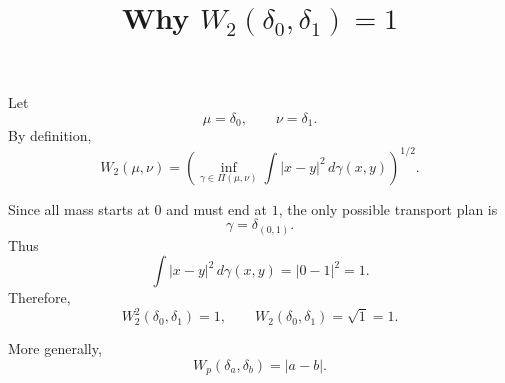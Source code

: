 \documentclass[11pt]{article}
\title{Why $W_2(\delta_0,\delta_1)=1$}
\author{}
\date{}
\begin{document}
\maketitle

Let
\[
\mu=\delta_0,
\qquad
\nu=\delta_1.
\]
By definition,
\[
W_2(\mu,\nu)
=
\left(
\inf_{\gamma\in\Pi(\mu,\nu)}
\int |x-y|^2\,d\gamma(x,y)
\right)^{1/2}.
\]

Since all mass starts at $0$ and must end at $1$, the only possible transport
plan is
\[
\gamma=\delta_{(0,1)}.
\]
Thus
\[
\int |x-y|^2\,d\gamma(x,y)
=
|0-1|^2
=
1.
\]
Therefore,
\[
W_2^2(\delta_0,\delta_1)=1,
\qquad
W_2(\delta_0,\delta_1)=\sqrt{1}=1.
\]

More generally,
\[
W_p(\delta_a,\delta_b)=|a-b|.
\]
\end{document}
